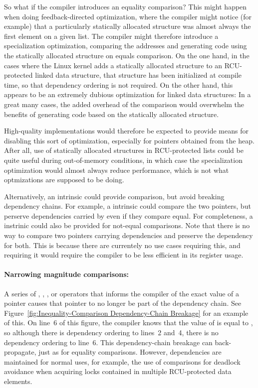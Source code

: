 \documentclass[letterpaper,twocolumn,10pt]{article}
\begin{document}
So what if the compiler introduces an equality comparison?
This might happen when doing feedback-directed optimization,
where the compiler might notice (for example) that a particularly
statically allocated structure was almost always the first
element on a given list.
The compiler might therefore introduce a specialization
optimization, comparing the addresses and generating code
using the statically allocated structure on equals
comparison.
On the one hand, in the cases where the Linux kernel adds
a statically allocated structure to an RCU-protected linked
data structure, that structure has been initialized at compile
time, so that dependency ordering is not required.
On the other hand, this appears to be an extremely dubious
optimization for linked data structures:  In a great many cases,
the added overhead of the comparison would overwhelm the benefits
of generating code based on the statically allocated
structure.

High-quality implementations would therefore be expected to
provide means for disabling this sort of optimization, especially
for pointers obtained from the heap.
After all, use of statically allocated structures in RCU-protected
lists could be quite useful during out-of-memory conditions,
in which case the specialization optimization would almost always
reduce performance, which is not what optmizations are supposed to be
doing.

Alternatively, an intrinsic could provide comparison, but avoid
breaking dependency chains.
For example, a  intrinsic could
compare the two pointers, but perserve dependencies carried
by  even if they compare equal.
For completeness, a 
instrinic could also be provided for not-equal comparisons.
Note that there is no way to compare two pointers carrying
dependencies and preserve the dependency for both.
This is because there are currentely no use cases requiring this,
and requiring it would require the compiler to be less efficient
in its register usage.

\paragraph{Narrowing magnitude comparisons:}
A series of \co{>}, \co{<}, \co{>=}, or \co{<=} operators that
informs the compiler of the exact value of a pointer causes that
pointer to no longer be part of the dependency chain.
See Figure~\ref{fig:Inequality-Comparison Dependency-Chain Breakage}
for an example of this.
On line~6 of this figure, the compiler knows that the value of
 is equal to , so although there is dependency
ordering to lines~2 and~4, there is no dependency ordering to
line~6.
This dependency-chain breakage can back-propagate, just as
for equality comparisons.
However, dependencies are maintained for normal uses, for
example, the use of comparisons for deadlock avoidance
when acquiring locks contained in multiple RCU-protected
data elements.
\end{document}
